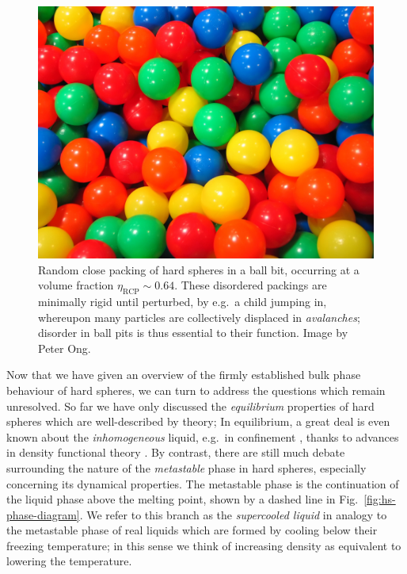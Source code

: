 \documentclass[11pt,twoside]{report}
\begin{document}
\begin{figure}
  \includegraphics[width=0.75\linewidth,outer]{ball-pit-horizontal}
  \caption[Random close packing in a ball pit]{
    Random close packing of hard spheres in a ball bit, occurring at a volume fraction $\eta_\mathrm{RCP} \sim 0.64$.
    These disordered packings are minimally rigid until perturbed, by e.g.\ a child jumping in, whereupon many particles are collectively displaced in \emph{avalanches}; disorder in ball pits is thus essential to their function.
    Image by Peter Ong.}
  \label{fig:rcp}
\end{figure}

Now that we have given an overview of the firmly established bulk phase behaviour of hard spheres, we can turn to address the questions which remain unresolved.
So far we have only discussed the \emph{equilibrium} properties of hard spheres which are well-described by theory; In equilibrium, a great deal is even known about the \emph{inhomogeneous} liquid, e.g.\ in confinement \cite{GonzalezJCP1998}, thanks to advances in density functional theory \cite{RosenfeldPRL1989,RothJPCM2010}.
By contrast, there are still much debate surrounding the nature of the \emph{metastable} phase in hard spheres, especially concerning its dynamical properties.
The metastable phase is the continuation of the liquid phase above the melting point, shown by a dashed line in Fig.\ \ref{fig:hs-phase-diagram}.
We refer to this branch as the \emph{supercooled liquid} in analogy to the metastable phase of real liquids which are formed by cooling below their freezing temperature; in this sense we think of increasing density as equivalent to lowering the temperature.
\end{document}
